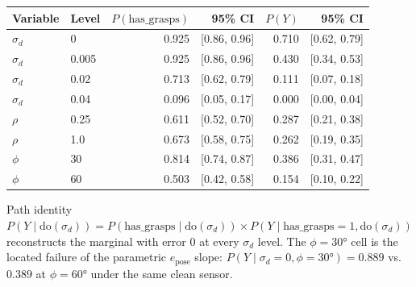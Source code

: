\documentclass[11pt,a4paper]{report}
\begin{document}
\begin{center}
\small
\begin{tabular}{llrrrr}
  \toprule
  Variable & Level & $P(\text{has\_grasps})$ & 95\% CI & $P(Y)$ & 95\% CI \\
  \midrule
  $\sigma_d$ & 0     & 0.925 & [0.86, 0.96] & 0.710 & [0.62, 0.79] \\
  $\sigma_d$ & 0.005 & 0.925 & [0.86, 0.96] & 0.430 & [0.34, 0.53] \\
  $\sigma_d$ & 0.02  & 0.713 & [0.62, 0.79] & 0.111 & [0.07, 0.18] \\
  $\sigma_d$ & 0.04  & 0.096 & [0.05, 0.17] & 0.000 & [0.00, 0.04] \\
  $\rho$     & 0.25  & 0.611 & [0.52, 0.70] & 0.287 & [0.21, 0.38] \\
  $\rho$     & 1.0   & 0.673 & [0.58, 0.75] & 0.262 & [0.19, 0.35] \\
  $\phi$     & 30    & 0.814 & [0.74, 0.87] & 0.386 & [0.31, 0.47] \\
  $\phi$     & 60    & 0.503 & [0.42, 0.58] & 0.154 & [0.10, 0.22] \\
  \bottomrule
\end{tabular}
\end{center}

Path identity $P(Y\mid\mathrm{do}(\sigma_d)) = P(\text{has\_grasps}\mid\mathrm{do}(\sigma_d)) \times P(Y\mid\text{has\_grasps}{=}1,\mathrm{do}(\sigma_d))$ reconstructs the marginal with error 0 at every $\sigma_d$ level. The $\phi=30°$ cell is the located failure of the parametric $e_{\text{pose}}$ slope: $P(Y\mid\sigma_d{=}0,\phi{=}30°)=0.889$ vs.\ $0.389$ at $\phi=60°$ under the same clean sensor.
\end{document}

